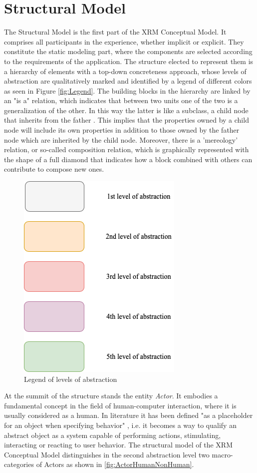 \section{Structural Model}
\label{sec:conceptual-structural}

The Structural Model is the first part of the XRM Conceptual Model. It comprises all participants in the experience, whether implicit or explicit. They constitute the static modeling part, where the components are selected according to the requirements of the application. The structure elected to represent them is a hierarchy of elements with a top-down concreteness approach, whose levels of abstraction are qualitatively marked and identified by a legend of different colors as seen in Figure \autoref{fig:Legend}. The building blocks in the hierarchy are linked by an "is a" relation, which indicates that between two units one of the two is a generalization of the other. In this way the latter is like a  subclass, a child node that inherits from the father \cite{brachman_what_1983}. This implies that the properties owned by a child node will include its own properties in addition to those owned by the father node which are inherited by the child node. Moreover, there is a 'mereology' relation, or so-called composition relation, which is graphically represented with the shape of a full diamond that indicates how a block combined with others can contribute to compose new ones. 

\begin{figure}[h]
	\centering
	\includegraphics[width=0.5\linewidth]{Figures/Conceptual Model/Legend.png}
	\caption{Legend of levels of abstraction}
	\label{fig:Legend}
\end{figure}

At the summit of the structure stands the entity \emph{Actor}. It embodies a fundamental concept in the field of human-computer interaction, where it is usually considered as a human. In literature it has been defined "as a placeholder for an object when specifying behavior" \cite{de_troyer_conceptual_2007}, i.e. it becomes a way to qualify an abstract object as a system capable of performing actions, stimulating, interacting or reacting to user behavior. The structural model of the XRM Conceptual Model distinguishes in the second abstraction level two macro-categories of Actors as shown in \autoref{fig:ActorHumanNonHuman}.

